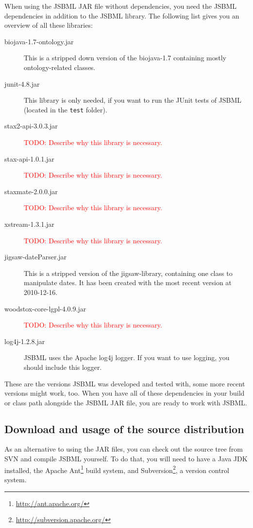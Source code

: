 When using the JSBML JAR file without dependencies, you need the JSBML
dependencies in addition to the JSBML library. The following list gives you an
overview of all these libraries:
\begin{description}
\item[biojava-1.7-ontology.jar] This is a stripped down version of the
biojava-1.7 containing mostly ontology-related classes.
\item[junit-4.8.jar]This library is only needed, if you want to run the JUnit
tests of JSBML (located in the \texttt{test} folder).
\item[stax2-api-3.0.3.jar] \textcolor{red}{TODO: Describe why this library is
necessary.}
\item[stax-api-1.0.1.jar] \textcolor{red}{TODO: Describe why this library is
necessary.}%
\item[staxmate-2.0.0.jar] \textcolor{red}{TODO: Describe why this library is
necessary.}
\item[xstream-1.3.1.jar] \textcolor{red}{TODO: Describe why this library is
necessary.}
\item[jigsaw-dateParser.jar] This is a stripped version of the jigsaw-library,
containing one class to manipulate dates. It has been created with the most
recent version at 2010-12-16.
\item[woodstox-core-lgpl-4.0.9.jar] \textcolor{red}{TODO: Describe why this
library is necessary.}
\item[log4j-1.2.8.jar] JSBML uses the Apache log4j logger. If you want to use
logging, you should include this logger.
\end{description}
These are the versions JSBML was developed and tested with, some more recent
versions might work, too. When you have all of these dependencies in your build
or class path alongside the JSBML JAR file, you are ready to work with JSBML.


\subsection{Download and usage of the source distribution}

As an alternative to using the JAR files, you can check out the source tree from
SVN and compile JSBML yourself. To do that, you will need to have a Java
JDK installed, the Apache
Ant\footnote{\url{http://ant.apache.org/}\label{fn:ant}} build system, and
Subversion\footnote{\url{http://subversion.apache.org/}\label{fn:svn}}, a
version control system.

